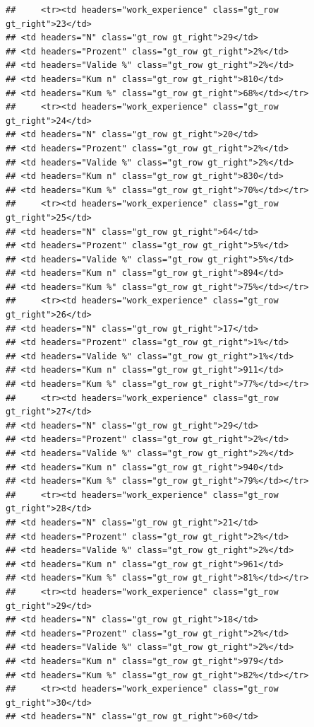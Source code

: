 \documentclass[
  a4paper,
  DIV=11,
  numbers=noendperiod]{scrartcl}
\begin{document}
\begin{verbatim}
##     <tr><td headers="work_experience" class="gt_row gt_right">23</td>
## <td headers="N" class="gt_row gt_right">29</td>
## <td headers="Prozent" class="gt_row gt_right">2%</td>
## <td headers="Valide %" class="gt_row gt_right">2%</td>
## <td headers="Kum n" class="gt_row gt_right">810</td>
## <td headers="Kum %" class="gt_row gt_right">68%</td></tr>
##     <tr><td headers="work_experience" class="gt_row gt_right">24</td>
## <td headers="N" class="gt_row gt_right">20</td>
## <td headers="Prozent" class="gt_row gt_right">2%</td>
## <td headers="Valide %" class="gt_row gt_right">2%</td>
## <td headers="Kum n" class="gt_row gt_right">830</td>
## <td headers="Kum %" class="gt_row gt_right">70%</td></tr>
##     <tr><td headers="work_experience" class="gt_row gt_right">25</td>
## <td headers="N" class="gt_row gt_right">64</td>
## <td headers="Prozent" class="gt_row gt_right">5%</td>
## <td headers="Valide %" class="gt_row gt_right">5%</td>
## <td headers="Kum n" class="gt_row gt_right">894</td>
## <td headers="Kum %" class="gt_row gt_right">75%</td></tr>
##     <tr><td headers="work_experience" class="gt_row gt_right">26</td>
## <td headers="N" class="gt_row gt_right">17</td>
## <td headers="Prozent" class="gt_row gt_right">1%</td>
## <td headers="Valide %" class="gt_row gt_right">1%</td>
## <td headers="Kum n" class="gt_row gt_right">911</td>
## <td headers="Kum %" class="gt_row gt_right">77%</td></tr>
##     <tr><td headers="work_experience" class="gt_row gt_right">27</td>
## <td headers="N" class="gt_row gt_right">29</td>
## <td headers="Prozent" class="gt_row gt_right">2%</td>
## <td headers="Valide %" class="gt_row gt_right">2%</td>
## <td headers="Kum n" class="gt_row gt_right">940</td>
## <td headers="Kum %" class="gt_row gt_right">79%</td></tr>
##     <tr><td headers="work_experience" class="gt_row gt_right">28</td>
## <td headers="N" class="gt_row gt_right">21</td>
## <td headers="Prozent" class="gt_row gt_right">2%</td>
## <td headers="Valide %" class="gt_row gt_right">2%</td>
## <td headers="Kum n" class="gt_row gt_right">961</td>
## <td headers="Kum %" class="gt_row gt_right">81%</td></tr>
##     <tr><td headers="work_experience" class="gt_row gt_right">29</td>
## <td headers="N" class="gt_row gt_right">18</td>
## <td headers="Prozent" class="gt_row gt_right">2%</td>
## <td headers="Valide %" class="gt_row gt_right">2%</td>
## <td headers="Kum n" class="gt_row gt_right">979</td>
## <td headers="Kum %" class="gt_row gt_right">82%</td></tr>
##     <tr><td headers="work_experience" class="gt_row gt_right">30</td>
## <td headers="N" class="gt_row gt_right">60</td>

\end{verbatim}
\end{document}
